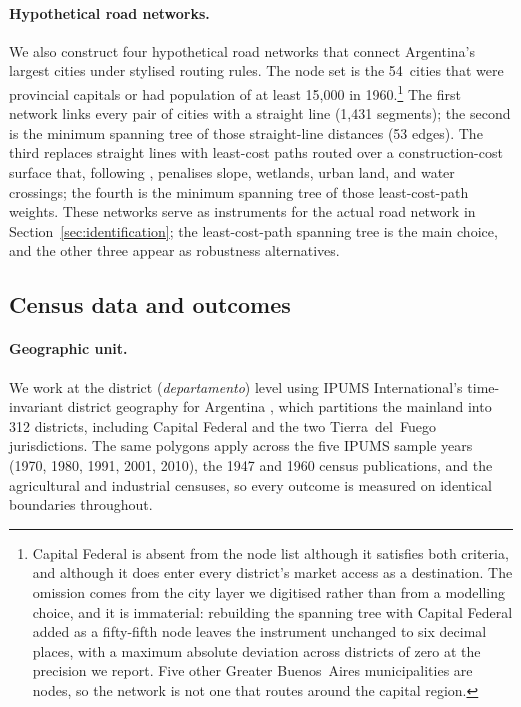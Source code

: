 \paragraph{Hypothetical road networks.}
We also construct four hypothetical road networks that connect
Argentina's largest cities under stylised routing rules. The node set
is the 54~cities that were provincial capitals or had population of
at least 15{,}000 in 1960.\footnote{Capital Federal is absent from the
node list although it satisfies both criteria, and although it does
enter every district's market access as a destination. The omission
comes from the city layer we digitised rather than from a modelling
choice, and it is immaterial: rebuilding the spanning tree with Capital
Federal added as a fifty-fifth node leaves the instrument unchanged to
six decimal places, with a maximum absolute deviation across districts
of zero at the precision we report. Five other Greater Buenos~Aires
municipalities are nodes, so the network is not one that routes around
the capital region.}
The first network links every pair of cities with a straight
line (1{,}431 segments); the second is the
minimum spanning tree of those straight-line distances (53 edges).
The third replaces straight lines with least-cost paths routed over a
construction-cost surface that, following \citet{faber2014},
penalises slope, wetlands, urban land, and water crossings; the
fourth is the minimum spanning tree of those least-cost-path weights.
These networks serve as instruments for the actual road network in
Section~\ref{sec:identification}; the least-cost-path spanning tree
is the main choice, and the other three appear as robustness
alternatives.

\subsection{Census data and outcomes}
\label{ssec:census}

\paragraph{Geographic unit.}
We work at the district (\emph{departamento}) level using IPUMS
International's time-invariant district geography for Argentina
\citep{ipums2020}, which partitions the mainland into 312
districts, including Capital Federal and the two Tierra~del~Fuego
jurisdictions. The same polygons apply across the five IPUMS sample
years (1970, 1980, 1991, 2001, 2010), the 1947 and 1960 census
publications, and the agricultural and industrial censuses, so every
outcome is measured on identical boundaries throughout.

